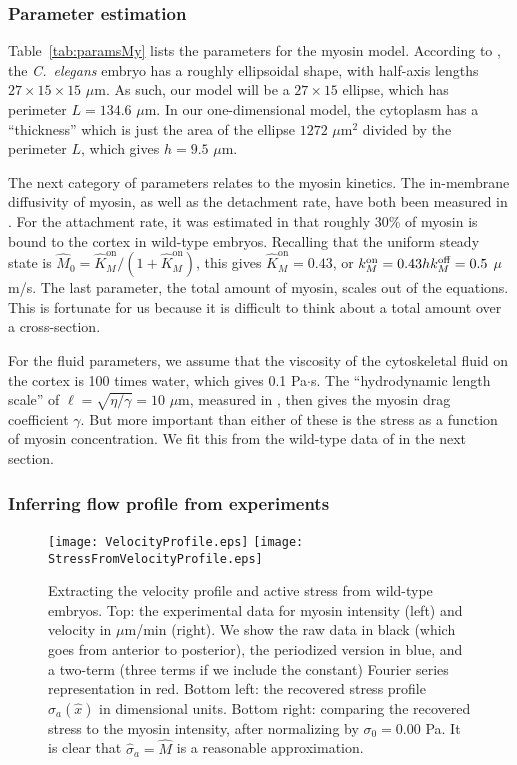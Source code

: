 \documentclass[11pt]{article}
\newcommand{\6}[1]{#1_{\text{6}}}
\newcommand{\3}[1]{#1_{\text{3}}}
\begin{document}
\subsubsection{Parameter estimation}
Table\ \ref{tab:paramsMy} lists the parameters for the myosin model. According to \cite{goehring2011polarization}, the \emph{C.\ elegans} embryo has a roughly ellipsoidal shape, with half-axis lengths $27 \times 15 \times 15$ $\mu$m. As such, our model will be a $27 \times 15$ ellipse, which has perimeter $L=134.6$ $\mu$m. In our one-dimensional model, the cytoplasm has a ``thickness'' which is just the area of the ellipse $1272$ $\mu$m$^2$ divided by the perimeter $L$, which gives $h=9.5$ $\mu$m.

The next category of parameters relates to the myosin kinetics. The in-membrane diffusivity of myosin, as well as the detachment rate, have both been measured in \cite{gross2019guiding}. For the attachment rate, it was estimated in \cite[Fig.~S3m]{gross2019guiding} that roughly 30\% of myosin is bound to the cortex in wild-type embryos. Recalling that the uniform steady state is $\hat M_0=\hat{K}^\text{on}_M/\left(1+\hat{K}^\text{on}_M\right)$, this gives $\hat{K}^\text{on}_M=0.43$, or $k^\text{on}_M = 0.43hk^\text{off}_M=0.5$ $\mu$m/s. The last parameter, the total amount of myosin, scales out of the equations. This is fortunate for us because it is difficult to think about a total amount over a cross-section. 

For the fluid parameters, we assume that the viscosity of the cytoskeletal fluid on the cortex is 100 times water, which gives 0.1 Pa$\cdot$s. The ``hydrodynamic length scale'' of $\ell=\sqrt{\eta/\gamma}=10$ $\mu$m, measured in \cite{saha2016determining}, then gives the myosin drag coefficient $\gamma$. But more important than either of these is the stress as a function of myosin concentration. We fit this from the wild-type data of \cite{sailer2015dynamic} in the next section.

\subsubsection{Inferring flow profile from experiments \label{sec:MyVelFit}}
\begin{figure}
\centering
\texttt{[image: VelocityProfile.eps]}
\texttt{[image: StressFromVelocityProfile.eps]}
\caption{\label{fig:VelProf} Extracting the velocity profile and active stress from wild-type embryos. Top: the experimental data for myosin intensity (left) and velocity in $\mu$m/min (right). We show the raw data in black (which goes from anterior to posterior), the periodized version in blue, and a two-term (three terms if we include the constant) Fourier series representation in red. Bottom left: the recovered stress profile $\sigma_a(\hat x)$ in dimensional units. Bottom right: comparing the recovered stress to the myosin intensity, after normalizing by $\sigma_0=0.00$ Pa. It is clear that $\hat \sigma_a = \hat M$ is a reasonable approximation.}
\end{figure}
\end{document}
